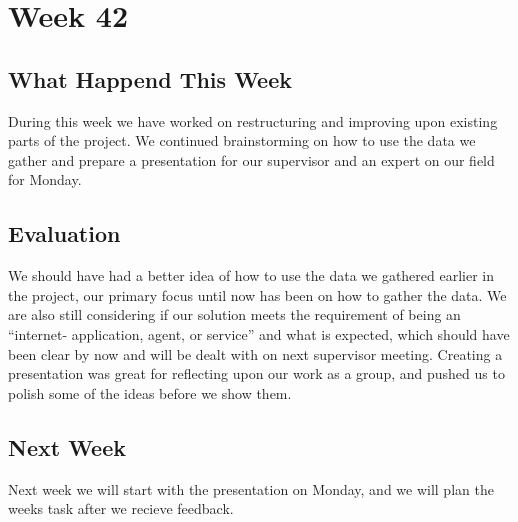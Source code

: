 \section*{Week 42}
\subsection*{What Happend This Week} 
During this week we have worked on restructuring and improving upon existing
parts of the project. We continued brainstorming on how to use the data we
gather and prepare a presentation for our supervisor and an expert on our field
for Monday.

\subsection*{Evaluation}
We should have had a better idea of how to use the data we gathered earlier in
the project, our primary focus until now has been on how to gather the data. We
are also still considering if our solution meets the requirement of being an
``internet- application, agent, or service'' and what is expected, which should
have been clear by now and will be dealt with on next supervisor meeting.
Creating a presentation was great for reflecting upon our work as a group, and
pushed us to polish some of the ideas before we show them.

\subsection*{Next Week}
Next week we will start with the presentation on Monday, and we will plan the
weeks task after we recieve feedback.


